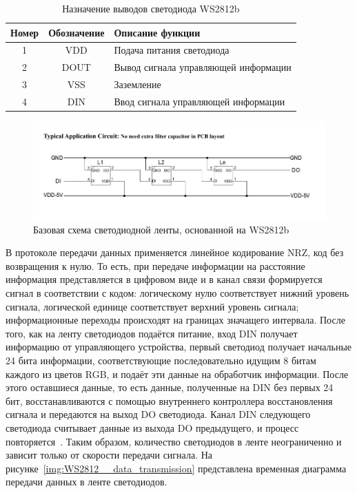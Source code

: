 \begin{table}[H]
  \caption{Назначение выводов светодиода WS2812b}
  \label{tab:ws2812__pin}
  \begin{tabular}{|c|c|l|}
  \hline
  Номер & Обозначение & Описание функции \\ \hline
  1 & VDD  & Подача питания светодиода            \\ \hline
  2 & DOUT & Вывод сигнала управляющей информации \\ \hline
  3 & VSS  & Заземление                           \\ \hline
  4 & DIN  & Ввод сигнала управляющей информации  \\ \hline
  \end{tabular}
  \end{table}

\begin{figure}[H]
  \centering
  \includegraphics[height=0.2\textheight]{assets/images/theoretical/Базовая схема светодиодной ленты.png}
  \caption{Базовая схема светодиодной ленты, основанной на WS2812b}
  \label{img:WS2812__strip}
\end{figure}


В протоколе передачи данных применяется линейное кодирование NRZ, код без возвращения к нулю. То есть, при передаче информации на расстояние информация представляется в цифровом виде и в канал связи формируется сигнал в соответствии с кодом: логическому нулю соответствует нижний уровень сигнала, логической единице соответствует верхний уровень сигнала; информационные переходы происходят на границах значащего интервала. После того, как на ленту светодиодов подаётся питание, вход DIN получает информацию от управляющего устройства, первый светодиод получает начальные 24 бита информации, соответствующие последовательно идущим 8 битам каждого из цветов RGB, и подаёт эти данные на обработчик информации. После этого оставшиеся данные, то есть данные, полученные на DIN без первых 24 бит, восстанавливаются  с помощью внутреннего контроллера восстановления сигнала и передаются на выход DO светодиода. Канал DIN следующего светодиода считывает данные из выхода DO предыдущего, и процесс повторяется~\cite{Worldseim}. Таким образом, количество светодиодов в ленте неограниченно и зависит только от скорости передачи сигнала. На рисунке~\ref{img:WS2812__data_transmission} представлена временная диаграмма передачи данных в ленте светодиодов.

